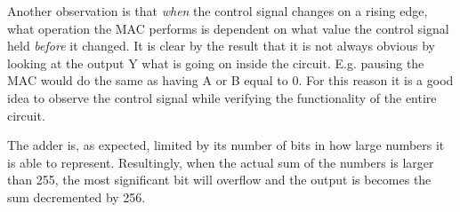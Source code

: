 Another observation is that \textit{when} the control signal changes on a rising edge, what operation the MAC performs is dependent on what value the control signal held \textit{before} it changed. It is clear by the result that it is not always obvious by looking at the output Y what is going on inside the circuit. E.g. pausing the MAC would do the same as having A or B equal to 0. For this reason it is a good idea to observe the control signal while verifying the functionality of the entire circuit. 

The adder is, as expected, limited by its number of bits in how large numbers it is able to represent. Resultingly, when the actual sum of the numbers is larger than 255, the most significant bit will overflow and the output is becomes the sum decremented by 256.










